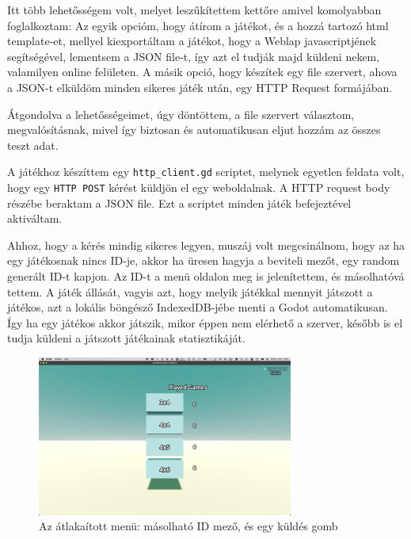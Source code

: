 Itt több lehetősségem volt, melyet leszűkítettem kettőre amivel komolyabban foglalkoztam:
Az egyik opcióm, hogy átírom a játékot, és a hozzá tartozó html template-et, mellyel kiexportáltam a játékot, hogy a Weblap javascriptjének segítségével, lementsem a JSON file-t, így azt el tudják majd küldeni nekem, valamilyen online felületen. 
A másik opció, hogy készítek egy file szervert, ahova a JSON-t elküldöm minden sikeres játék után, egy HTTP Request formájában.

Átgondolva a lehetősségeimet, úgy döntöttem, a file szervert választom, megvalósításnak, mivel így biztosan és automatikusan eljut hozzám az összes teszt adat.

A játékhoz készíttem egy  \lstinline{http_client.gd} scriptet, melynek egyetlen feldata volt, hogy egy  \lstinline{HTTP POST} kérést küldjön el egy weboldalnak. A HTTP request body részébe beraktam a JSON file. Ezt a scriptet minden játék befejeztével aktiváltam. 

Ahhoz, hogy a kérés mindig sikeres legyen, muszáj volt megcsinálnom, hogy az ha egy játékosnak nincs ID-je, akkor ha üresen hagyja a beviteli mezőt, egy random generált ID-t kapjon. Az ID-t a menü oldalon meg is jelenítettem, és másolhatóvá tettem. 
A játék állását, vagyis azt, hogy melyik játékkal mennyit játszott a játékos, azt a lokális böngésző IndexedDB-jébe menti a Godot automatikusan. Így ha egy játékos akkor játszik, mikor éppen nem elérhető a szerver, később is el tudja küldeni a játszott játékainak statisztikáját.
\begin{figure}[h]
    \centering
    \includegraphics[width=0.75\textwidth]{img/menu_remake.png}
    \caption{Az átlakaított menü: másolható ID mező, és egy küldés gomb}
    \label{img:menu_remake}  
\end{figure}

